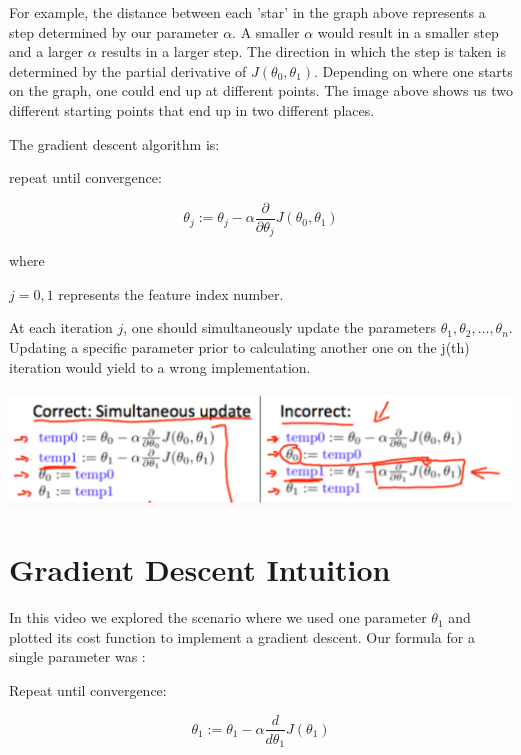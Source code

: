 \documentclass[10pt,a4paper,UTF8]{article}
\begin{document}
For example, the distance between each 'star' in the graph above represents a step determined by our parameter \(\alpha\). A smaller \(\alpha\) would result in a smaller step and a larger \(\alpha\) results in a larger step. The direction in which the step is taken is determined by the partial derivative of \(J(\theta_{0},\theta_{1})\). Depending on where one starts on the graph, one could end up at different points. The image above shows us two different starting points that end up in two different places.

The gradient descent algorithm is:

repeat until convergence:

\begin{equation}
\label{eq:2}
\theta_j := \theta_j - \alpha \frac{\partial}{\partial \theta_j} J(\theta_0, \theta_1)
\end{equation}

where

\(j=0,1\) represents the feature index number.

At each iteration \(j\), one should simultaneously update the parameters  \(\theta_{1},\theta_{2},\ldots ,\theta_{n}\). Updating a specific parameter prior to calculating another one on the j(th) iteration would yield to a wrong implementation.

\begin{center}
\includegraphics[width=.9\linewidth]{../../img/computer_ng/20171006simultaneousUpdate.png}
\end{center}

\section{Gradient Descent Intuition}
\label{sec:org3a2cf33}


In this video we explored the scenario where we used one parameter \(\theta_{1}\) and plotted its cost function to implement a gradient descent. Our formula for a single parameter was :

Repeat until convergence:

\begin{equation}
\label{eq:3}
\theta_1:=\theta_1-\alpha \frac{d}{d\theta_1} J(\theta_1)
\end{equation}
\end{document}
